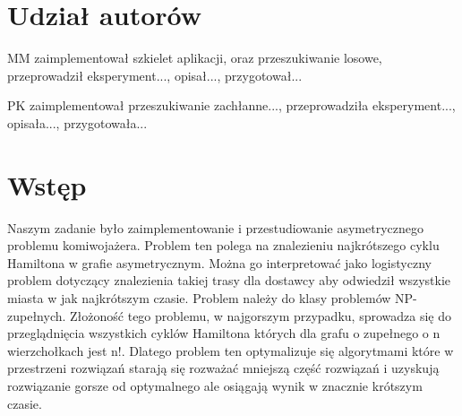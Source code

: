\documentclass{article}
\begin{document}


\section*{Udział autorów}
\begin{tightlist}
\item MM zaimplementował szkielet aplikacji, oraz przeszukiwanie losowe, przeprowadził eksperyment..., opisał..., przygotował...
\item PK zaimplementował przeszukiwanie zachłanne..., przeprowadziła eksperyment..., opisała..., przygotowała...
\end{tightlist}






\section{Wstęp}



Naszym zadanie było zaimplementowanie i przestudiowanie asymetrycznego problemu komiwojażera. Problem ten polega na znalezieniu najkrótszego cyklu Hamiltona w grafie asymetrycznym. Można go interpretować jako logistyczny problem dotyczący znalezienia takiej trasy dla dostawcy aby odwiedził wszystkie miasta w jak najkrótszym czasie. Problem należy do klasy problemów NP-zupełnych. Złożoność tego problemu, w najgorszym przypadku, sprowadza się do przeglądnięcia wszystkich cyklów Hamiltona których dla grafu o zupełnego o n wierzchołkach jest n!. Dlatego problem ten optymalizuje się algorytmami które w przestrzeni rozwiązań starają się rozważać mniejszą część rozwiązań i uzyskują rozwiązanie gorsze od optymalnego ale osiągają wynik w znacznie krótszym czasie.
\end{document}
